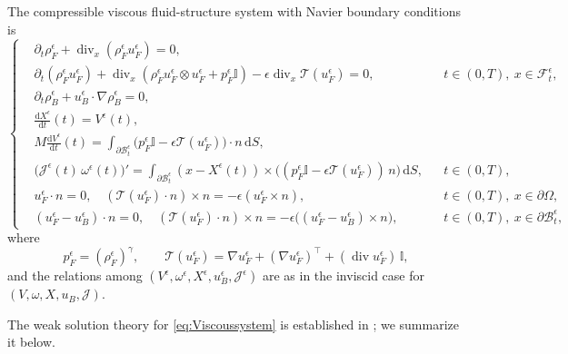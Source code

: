 \documentclass[11pt,twoside,reqno]{amsart}
\numberwithin{equation}{section}
\numberwithin{figure}{section}
\newcommand{\qnt}[1]{\left(#1\right)}
\begin{document}
The compressible viscous fluid-structure system with Navier boundary conditions is
\begin{equation}\label{eq:Viscoussystem}
\left\{
\begin{aligned}
&\partial_t \rho_F^\epsilon + \operatorname{div}_x(\rho_F^\epsilon u_F^\epsilon) = 0,\\
&\partial_t (\rho_F^\epsilon u_F^\epsilon) + \operatorname{div}_x(\rho_F^\epsilon u_F^\epsilon \otimes u_F^\epsilon + p_F^\epsilon \mathbb{I})
  - \epsilon \operatorname{div}_x \mathcal{T}(u_F^\epsilon) = 0,
  && t \in (0,T),\ x \in \mathcal{F}_t^\epsilon,\\
&\partial_t \rho_B^\epsilon + u_B^\epsilon \cdot \nabla \rho_B^\epsilon = 0,\\
&\frac{\mathrm{d}X^\epsilon}{\mathrm{d}t}(t) = V^\epsilon(t),\\
&M \frac{\mathrm{d}V^\epsilon}{\mathrm{d}t}(t)
  = \int_{\partial \mathcal{B}_t^\epsilon} \big( p_F^\epsilon \mathbb{I} - \epsilon \mathcal{T}(u_F^\epsilon) \big)\cdot n \, \mathrm{d}S,\\
&\big(\mathcal{J}^\epsilon(t)\,\omega^\epsilon(t)\big)'
  = \int_{\partial \mathcal{B}_t^\epsilon} (x - X^\epsilon(t)) \times
     \big( (p_F^\epsilon \mathbb{I} - \epsilon \mathcal{T}(u_F^\epsilon))\, n \big)\, \mathrm{d}S,
  && t \in (0,T),\\
&u_F^\epsilon \cdot n = 0,\quad
  (\mathcal{T}(u_F^\epsilon)\cdot n)\times n = -\epsilon (u_F^\epsilon \times n),
  && t \in (0,T),\ x \in \partial \Omega,\\
&(u_F^\epsilon - u_B^\epsilon)\cdot n = 0,\quad
  (\mathcal{T}(u_F^\epsilon)\cdot n)\times n = -\epsilon \big((u_F^\epsilon - u_B^\epsilon)\times n\big),
  && t \in (0,T),\ x \in \partial \mathcal{B}_t^\epsilon,
\end{aligned}
\right.
\end{equation}
where
\[
p_F^\epsilon = (\rho_F^\epsilon)^\gamma,\qquad
\mathcal{T}(u_F^\epsilon) = \nabla u_F^\epsilon + (\nabla u_F^\epsilon)^{\!\top}
+ (\operatorname{div} u_F^\epsilon)\, \mathbb{I},
\]
and the relations among $\qnt{V^\epsilon, \omega^\epsilon, X^\epsilon, u_B^\epsilon, \mathcal{J}^\epsilon}$ are as in the inviscid case for $\qnt{V,\omega,X,u_B,\mathcal{J}}$.

The weak solution theory for \eqref{eq:Viscoussystem} is established in \cite{nevcasova2022motion}; we summarize it below.
\end{document}
